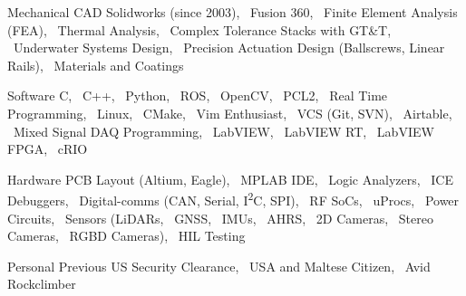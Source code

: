 
\begin{cvskills}

  \cvskill%
      {Mechanical}
      {
            CAD Solidworks (since 2003),
            \ Fusion 360,
            \ Finite Element Analysis (FEA),
            \ Thermal Analysis,
            \ Complex Tolerance Stacks with GT\&T,
            \ Underwater Systems Design,
            \ Precision Actuation Design (Ballscrews, Linear Rails), 
            \ Materials and Coatings
      }

  \cvskill%
      {Software}
      {
            C,  
            \ C++,  
            \ Python,  
            \ ROS,  
            \ OpenCV,  
            \ PCL2,
            \ Real Time Programming,  
            \ Linux,  
            \ CMake,  
            \ Vim Enthusiast,
            \ VCS (Git, SVN),  
            \ Airtable,
            \ Mixed Signal DAQ Programming,  
            \ LabVIEW,  
            \ LabVIEW RT,  
            \ LabVIEW FPGA,  
            \ cRIO
        }

  \cvskill%
      {Hardware} 
      {
            PCB Layout (Altium, Eagle),
            \ MPLAB IDE, 
            \ Logic Analyzers, 
            \ ICE Debuggers, 
            \ Digital-comms (CAN, Serial, I\textsuperscript{2}C, SPI),
            \ RF SoCs, 
            \ uProcs, 
            \ Power Circuits, 
            \ Sensors (LiDARs, 
            \ GNSS, 
            \ IMUs, 
            \ AHRS, 
            \ 2D Cameras, 
            \ Stereo Cameras,  
            \ RGBD Cameras),
            \ HIL Testing
      }


  \cvskill%
      {Personal}
      {
            Previous US Security Clearance, 
            \ USA and Maltese Citizen, 
            \ Avid Rockclimber
      }

\end{cvskills}
